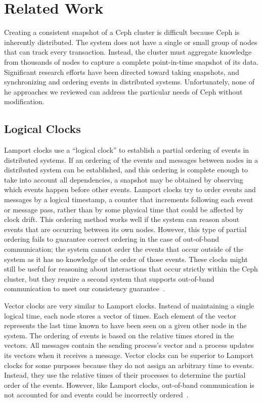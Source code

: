 \chapter{Related Work}
\label{sec:rel-work}

Creating a consistent snapshot of a Ceph cluster is difficult because
Ceph is inherently distributed. The system does not have a single or
small group of nodes that can track every transaction. Instead, the
cluster must aggregate knowledge from thousands of nodes to capture a
complete point-in-time snapshot of its data. Significant research
efforts have been directed toward taking snapshots, and synchronizing
and ordering events in distributed systems. Unfortunately, none of he
approaches we reviewed can address the particular needs of Ceph
without modification.

\section{Logical Clocks}

Lamport clocks use a ``logical clock'' to establish a partial ordering
of events in distributed systems. If an ordering of the events and
messages between nodes in a distributed system can be established, and
this ordering is complete enough to take into account all
dependencies, a snapshot may be obtained by observing which events
happen before other events. Lamport clocks try to order events and
messages by a logical timestamp, a counter that increments following
each event or message pass, rather than by some physical time that
could be affected by clock drift. This ordering method works well if
the system can reason about events that are occurring between its own
nodes. However, this type of partial ordering fails to guarantee
correct ordering in the case of out-of-band communication; the system
cannot order the events that occur outside of the system as it has no
knowledge of the order of those events. These clocks might still be
useful for reasoning about interactions that occur strictly within the
Ceph cluster, but they require a second system that supports
out-of-band communication to meet our consistency
guarantee~\citep{Lamport1978}.

Vector clocks are very similar to Lamport clocks. Instead of
maintaining a single logical time, each node stores a vector of
times. Each element of the vector represents the last time known to
have been seen on a given other node in the system. The ordering of
events is based on the relative times stored in the vectors. All
messages contain the sending process's vector and a process
updates its vectors when it receives a message. Vector clocks can be
superior to Lamport clocks for some purposes because they do not assign
an arbitrary time to events. Instead, they use the relative times of
their processes to determine the partial order of the events. However,
like Lamport clocks, out-of-band communication is not accounted for
and events could be incorrectly ordered~\citep{Fidge1988}.


